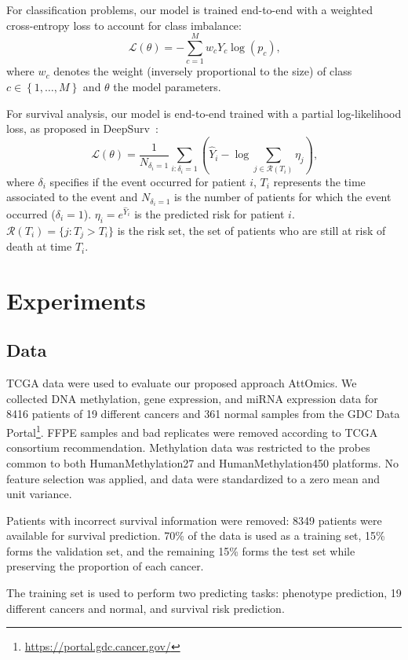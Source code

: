 \documentclass[../main.tex]{subfiles}
\begin{document}
	 For classification problems, our model is trained end-to-end with a weighted cross-entropy loss to account for class imbalance:
	 \[ \mathcal{L}(\theta) = - \sum_{c=1}^{M}w_c Y_c \log\left( p_c\right) \text{,}\]
	 where $w_c$ denotes the weight (inversely proportional to the size) of class $c \in \left\{1, \ldots,M \right\}$ and $\theta$ the model parameters.

	 For survival analysis, our model is end-to-end trained with a partial log-likelihood loss, as proposed in DeepSurv~\cite{katzmanDeepSurvPersonalizedTreatment2018}:
	 \[ \mathcal{L}(\theta) = \frac{1}{N_{\delta_i = 1}} \sum_{i:\delta_i=1} \left(\hat{Y}_i - \log \sum_{j \in \mathcal{R}(T_i)}\eta_j \right) \text{,}\]
	 where $\delta_i$ specifies if the event occurred for patient $i$, $T_i$ represents the time associated to the event and $N_{\delta_i = 1}$ is the number of patients for which the event occurred ($\delta_i = 1$).
	 $\eta_i = e^{\hat{Y}_i}$ is the predicted risk for patient $i$.
	 $\mathcal{R}(T_i) = \{j: T_j > T_i\}$ is the risk set, the set of patients who are still at risk of death at time $T_i$.

\section{Experiments}
 \subsection{Data}

	 TCGA data were used to evaluate our proposed approach AttOmics.
	 We collected DNA methylation, gene expression, and miRNA expression data for 8416 patients of 19 different cancers and 361 normal samples from the GDC Data Portal\footnote{\url{https://portal.gdc.cancer.gov/}}.
	 FFPE samples and bad replicates were removed according to TCGA consortium recommendation.
	 Methylation data was restricted to the probes common to both HumanMethylation27 and HumanMethylation450 platforms.
	 No feature selection was applied, and data were standardized to a zero mean and unit variance.

	 Patients with incorrect survival information were removed: 8349 patients were available for survival prediction.
	 70\% of the data is used as a training set, 15\% forms the validation set, and the remaining 15\% forms the test set while preserving the proportion of each cancer.

	 The training set is used to perform two predicting tasks: phenotype prediction, 19 different cancers and normal, and survival risk prediction.
\end{document}
